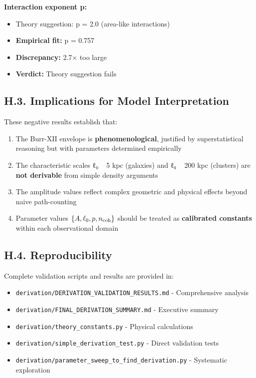 \documentclass[11pt,a4paper]{article}
\begin{document}
\textbf{Interaction exponent p:}

\begin{itemize}
\item Theory suggestion: p = 2.0 (area-like interactions)
\item \textbf{Empirical fit:} p = 0.757
\item \textbf{Discrepancy:} 2.7× too large
\item \textbf{Verdict:} Theory suggestion fails
\end{itemize}


\subsection{H.3. Implications for Model Interpretation}


These negative results establish that:


\begin{enumerate}
\item The Burr-XII envelope is \textbf{phenomenological}, justified by superstatistical reasoning but with parameters determined empirically
\item The characteristic scales ℓ₀ ~ 5 kpc (galaxies) and ℓ₀ ~ 200 kpc (clusters) are \textbf{not derivable} from simple density arguments
\item The amplitude values reflect complex geometric and physical effects beyond naive path-counting
\item Parameter values $\{A, \ell_0, p, n_{\rm coh}\}$ should be treated as \textbf{calibrated constants} within each observational domain
\end{enumerate}


\subsection{H.4. Reproducibility}


Complete validation scripts and results are provided in:

\begin{itemize}
\item \texttt{derivation/DERIVATION\_VALIDATION\_RESULTS.md} - Comprehensive analysis
\item \texttt{derivation/FINAL\_DERIVATION\_SUMMARY.md} - Executive summary
\item \texttt{derivation/theory\_constants.py} - Physical calculations
\item \texttt{derivation/simple\_derivation\_test.py} - Direct validation tests
\item \texttt{derivation/parameter\_sweep\_to\_find\_derivation.py} - Systematic exploration
\end{itemize}
\end{document}

